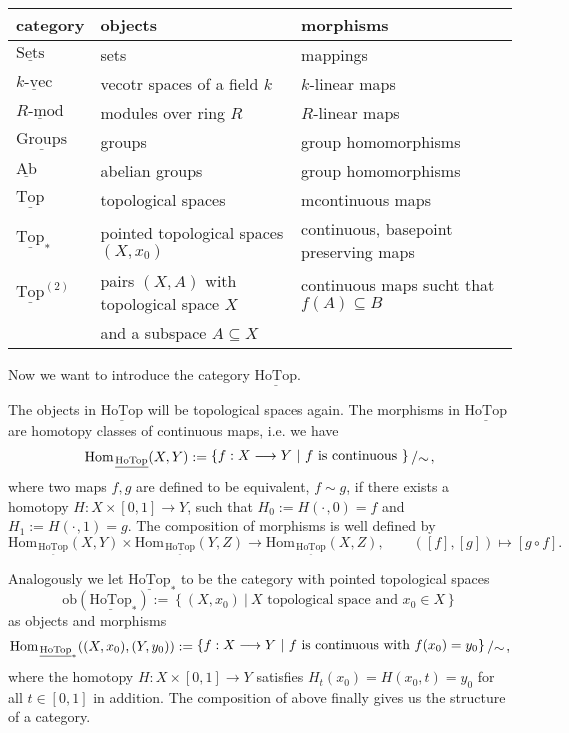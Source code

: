 \documentclass[11pt]{book}
\numberwithin{dummy}{section}
\theoremstyle{nonumberbreak}
\newenvironment{ex}[1][]{\ifthenelse{\equal{#1}{}}{\example}{\example[#1]}\rm}{\endexample}
\newcommand{\Hom}{\mathrm{Hom}\hspace{1pt}}
\newcommand{\sets}{\underline{\mathrm{Sets}}}
\newcommand{\Rmod}{\underline{R\textrm{-}\mathrm{mod}}}
\newcommand{\Ab}{\underline{\mathrm{Ab}}}
\newcommand{\kvec}{\underline{k\textrm{-}\mathrm{vec}}}
\newcommand{\grp}{\underline{\mathrm{Groups}}}
\newcommand{\topsp}{\underline{\mathrm{Top}}}
\newcommand{\topstar}{\underline{\mathrm{Top}}_*}
\newcommand{\hotop}{\underline{\mathrm{HoTop}}}
\newcommand{\hotopstar}{\underline{\mathrm{HoTop}}_{*}}
\newcommand{\toptwo}{\underline{\mathrm{Top}}^{(2)}}
\newcommand{\la}{\longrightarrow}
\newcommand{\slant}[2]{{\raisebox{.1em}{$#1$}\left/\raisebox{-.1em}{$#2$}\right.}}
\begin{document}
\begin{spacing}{1.4}
\begin{ex}
\begin{table}[h!]
  \centering
  \label{tab:table1}
  \begin{tabular}{lll}
    \toprule
    \textbf{category} & \textbf{objects} & \textbf{morphisms}\\
    \midrule
    $\sets$ & sets & mappings\\
    $\kvec$ & vecotr spaces of a field $k$ & $k$-linear maps\\
    $\Rmod$ & modules over  ring $R$ & $R$-linear maps \\
    $\grp$ & groups & group homomorphisms \\
    $ \Ab$ & abelian groups & group homomorphisms\\
    $ \topsp$ & topological spaces &mcontinuous maps \\
    $ \topstar$ & pointed topological spaces $(X,x_0)$ & continuous, basepoint preserving maps \\
    $ \toptwo$ & pairs $(X,A)$ with topological space $X$  & continuous maps sucht that $f(A) \subseteq B$ \\
    & and a subspace $A \subseteq X$ & \\
    \bottomrule
  \end{tabular}
\end{table}


\end{ex}


\begin{ex}   %
Now we want to introduce the category $\hotop$. 
\begin{compactenum}
\item The objects in $\hotop$ will be topological spaces again. The morphisms in $\hotop$ are homotopy classes of continuous maps, i.e. we have
$$\Hom_{\hotop}(X,Y) := \slant{\left\{ f: X \la Y \ \vert \ f \textrm{ is continuous } \right\} }{\sim},$$
where two maps $f,g$ are defined to be equivalent, $f \sim g$, if there exists a homotopy $H: X \times [0,1] \la Y$, such that $H_0 := H(\cdot \hspace{1pt},0) = f$ and $H_1 := H(\cdot \hspace{1pt},1) = g$. The composition of morphisms is well defined by 
$$\Hom_{\hotop}(X,Y) \times \Hom_{\hotop}(Y,Z) \la \Hom_{\hotop}(X,Z), \qquad ([f],[g]) \mapsto [g \circ f].$$
\item Analogously we let $\hotopstar$ to be the category with pointed topological spaces
$$\mathrm{ob}(\hotopstar) := \left\{ (X,x_0) \ \vert \ X \textrm{ topological space and } x_0 \in X \right\}$$
as objects and morphisms
$$\Hom_{\hotopstar}((X,x_0),(Y,y_0)) := \slant{\left\{f:X \la Y \ \vert \ f \textrm{ is continuous with } f(x_0)=y_0 \right\} }{\sim},$$
where the homotopy $H: X \times [0,1] \la Y$ satisfies $H_t(x_0) = H(x_0, t) = y_0$ for all $t \in [0,1]$ in addition. The composition of above finally gives us the structure of a category.



\end{compactenum}
\end{ex}
\end{spacing}
\end{document}
